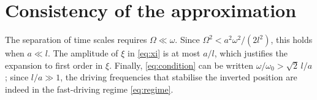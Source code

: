 \documentclass{article}
\begin{document}
\section{Consistency of the approximation}
The separation of time scales requires $\Omega \ll \omega$. Since $\Omega^2 < a^2\omega^2/(2l^2)$, this holds when $a \ll l$. The amplitude of $\xi$ in \eqref{eq:xi} is at most $a/l$, which justifies the expansion to first order in $\xi$. Finally, \eqref{eq:condition} can be written $\omega/\omega_0 > \sqrt{2}\,l/a$; since $l/a \gg 1$, the driving frequencies that stabilise the inverted position are indeed in the fast-driving regime \eqref{eq:regime}.
\end{document}
